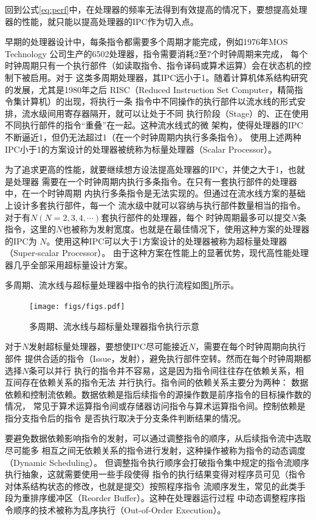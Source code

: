 回到公式\ref{eq:perf}中，在处理器的频率无法得到有效提高的情况下，要想提高处理
器的性能，就只能以提高处理器的IPC作为切入点。

早期的处理器设计中，每条指令都需要多个周期才能完成，例如1976年MOS Technology
公司生产的6502处理器，指令需要消耗2至7个时钟周期来完成\cite{6502manual}，
每个时钟周期只有一个执行部件（如读取指令、指令译码或算术运算）会在状态机的控制下被启用。对于
这类多周期处理器，其IPC远小于1。随着计算机体系结构研究的发展，尤其是1980年之后
RISC（Reduced Instruction Set Computer，精简指令集计算机）的出现，将执行一条
指令中不同操作的执行部件以流水线的形式安排，流水级间用寄存器隔开，就可以让处于不同
执行阶段（Stage）的、正在使用不同执行部件的指令“重叠”在一起。这种流水线式的微
架构，使得处理器的IPC不断逼近1，但仍无法超过1（在一个时钟周期内执行多条指令）。
使用上述两种IPC小于1的方案设计的处理器被统称为标量处理器（Scalar Processor）。

为了追求更高的性能，就要继续想方设法提高处理器的IPC，并使之大于1，也就是处理器
需要在一个时钟周期内执行多条指令。在只有一套执行部件的处理器中，在一个时钟周期
内执行多条指令是无法实现的。但通过在流水线方案的基础上设计多套执行部件，每一个
流水级中就可以容纳与执行部件数量相当的指令。对于有$N(N = 2,3,4,\cdots)$套执行部件的处理器，每个
时钟周期最多可以提交$N$条指令，这里的$N$也被称为发射宽度。也就是在最佳情况下，使用这种方案的处理器的IPC为
$N$。使用这种IPC可以大于1方案设计的处理器被称为超标量处理器（Super-scalar Processor）。
由于这种方案在性能上的显著优势，现代高性能处理器几乎全部采用超标量设计方案。

多周期、流水线与超标量处理器中指令的执行流程如图\ref{fig:exec-cmp}所示。

\begin{figure}[ht]
	\centering
	\texttt{[image: figs/figs.pdf]}
	\caption{多周期、流水线与超标量处理器指令执行示意}
	\label{fig:exec-cmp}
\end{figure}

对于$N$发射超标量处理器，要想使IPC尽可能接近$N$，需要在每个时钟周期向执行部件
提供合适的指令（Issue，发射），避免执行部件空转。然而在每个时钟周期都选择$N$条可以并行
执行的指令并不容易，这是因为指令间往往存在依赖关系，相互间存在依赖关系的指令无法
并行执行。指令间的依赖关系主要分为两种：
数据依赖和控制流依赖。数据依赖是指后续指令的源操作数是前序指令的目标操作数的情况，
常见于算术运算指令间或存储器访问指令与算术运算指令间。控制依赖是指分支指令后的指令
是否执行取决于分支条件判断结果的情况。

要避免数据依赖影响指令的发射，可以通过调整指令的顺序，从后续指令流中选取尽可能多
相互之间无依赖关系的指令进行发射，这种操作被称为指令的动态调度（Dynamic Scheduling）。
但调整指令执行顺序会打破指令集中规定的指令流顺序执行抽象，这就需要使用一些手段使得
指令的执行结果变得对程序员可见（指令对体系结构状态的修改，也就是提交）按照程序指令
流顺序发生，常见的此类手段为重排序缓冲区（Reorder Buffer）。这种在处理器运行过程
中动态调整程序指令顺序的技术被称为乱序执行（Out-of-Order Execution）。

